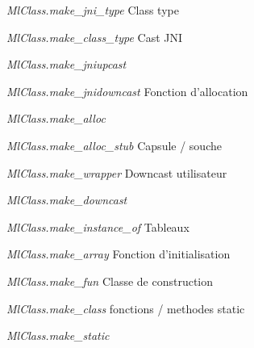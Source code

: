 \documentclass[a4paper, 11pt]{report}
\begin{document}
\emph{MlClass.make\_jni\_type}
\newline
Class type

\emph{MlClass.make\_class\_type}
\newline
Cast JNI

\emph{MlClass.make\_jniupcast}

\emph{MlClass.make\_jnidowncast}
\newline
Fonction d'allocation

\emph{MlClass.make\_alloc}

\emph{MlClass.make\_alloc\_stub}
\newline
Capsule / souche

\emph{MlClass.make\_wrapper}
\newline
Downcast utilisateur

\emph{MlClass.make\_downcast}

\emph{MlClass.make\_instance\_of}
\newline
Tableaux

\emph{MlClass.make\_array}
\newline
Fonction d'initialisation

\emph{MlClass.make\_fun}
\newline
Classe de construction

\emph{MlClass.make\_class}
\newline
fonctions / methodes static

\emph{MlClass.make\_static}
\end{document}
